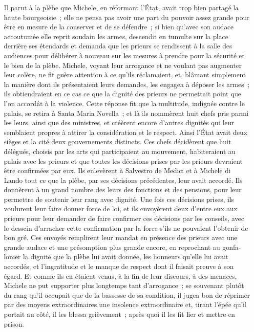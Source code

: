 \documentclass[french,twoside]{book} %
\newenvironment{quoteblock}%
  {\begin{quoting}}
  {\end{quoting}}
\newenvironment{quotebar}{%
    \def\FrameCommand{{\color{rubric!10!}\vrule width 0.5em} \hspace{0.9em}}%
    \def\OuterFrameSep{\itemsep} %
    \MakeFramed {\advance\hsize-\width \FrameRestore}
  }%
  {%
    \endMakeFramed
  }
\renewenvironment{quoteblock}%
  {%
    \savenotes
    \setstretch{0.9}
    \normalfont
    \begin{quotebar}
  }
  {%
    \end{quotebar}
    \spewnotes
  }
\begin{document}
\begin{quoteblock}
 Il parut à la plèbe que Michele, en réformant l'État, avait trop bien partagé la haute bourgeoisie ; elle ne pensa pas avoir une part du pouvoir assez grande pour être en mesure de la conserver et de se défendre ; si bien qu'avec son audace accoutumée elle reprit soudain les armes, descendit en tumulte sur la place derrière ses étendards et demanda que les prieurs se rendissent à la salle des audiences pour délibérer à nouveau sur les mesures à prendre pour la sécurité et le bien de la plèbe. Michele, voyant leur arrogance et ne voulant pas augmenter leur colère, ne fit guère attention à ce qu'ils réclamaient, et, blâmant simplement la manière dont ils présentaient leurs demandes, les engagea à déposer les armes ; ils obtiendraient en ce cas ce que la dignité des prieurs ne permettait point que l’on accordât à la violence. Cette réponse fit que la multitude, indignée contre le palais, se retira à Santa Maria Novella ; et là ils nommèrent huit chefs pris parmi les leurs, ainsi que des ministres, et créèrent encore d'autres dignités qui leur semblaient propres à attirer la considération et le respect. Ainsi l'État avait deux sièges et la cité deux gou­vernements distincts. Ces chefs décidèrent que huit délégués, choisis par les arts qui participaient au mouvement, habiteraient au palais avec les prieurs et que toutes les décisions prises par les prieurs devraient être confirmées par eux. Ils enlevèrent à Salvestro de Medici et à Michele di Lando tout ce que la plèbe, par ses décisions précédentes, leur avait accordé. Ils donnèrent à un grand nombre des leurs des fonctions et des pensions, pour leur permettre de soutenir leur rang avec dignité. Une fois ces décisions prises, ils voulurent leur faire donner force de loi, et ils envoyèrent deux d'entre eux aux prieurs pour leur demander de faire confirmer ces décisions par les conseils, avec le dessein d'arracher cette confirmation par la force s'ils ne pouvaient l'obtenir de bon gré. Ces envoyés remplirent leur mandat en présence des prieurs avec une grande audace et une présomption plus grande encore, en reprochant au gonfa­lonier la dignité que la plèbe lui avait donnée, les honneurs qu'elle lui avait accordés, et l'ingratitude et le manque de respect dont il faisait preuve à son égard. Et comme ils en étaient venus, à la fin de leur discours, à des menaces, Michele ne put supporter plus longtemps tant d'arrogance ; se souvenant plutôt du rang qu'il occupait que de la bassesse de sa condition, il jugea bon de réprimer par des moyens extraordinaires une insolence extraordinaire et, tirant l'épée qu'il portait au côté, il les blessa grièvement ; après quoi il les fit lier et mettre en prison.\par

\end{quoteblock}
\end{document}
